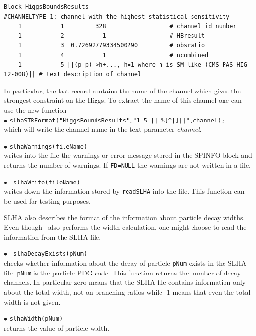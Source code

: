 \documentclass[12pt,a4paper]{article}
\begin{document}
{\scriptsize
\begin{verbatim}
Block HiggsBoundsResults 
#CHANNELTYPE 1: channel with the highest statistical sensitivity
    1           1         328                  # channel id number
    1           2           1                  # HBresult
    1           3  0.72692779334500290         # obsratio
    1           4           1                  # ncombined
    1           5 ||(p p)->h+..., h=1 where h is SM-like (CMS-PAS-HIG-12-008)|| # text description of channel
\end{verbatim}
}

\noindent 
In particular, the last record contains  the  name of the channel which gives the strongest constraint on the Higgs.  To extract the name
of this channel one can use the new function\\

\noindent
$\bullet$ \verb!slhaSTRFormat("HiggsBoundsResults","1 5 || %[^|]||",channel);!\\
which will write the channel name  in the text parameter {\it channel}. 

\noindent
$\bullet$ \verb|slhaWarnings(fileName)|\\                                                                              
writes into the file the warnings or error message  stored in the SPINFO block and
returns the number of warnings. If \verb|FD=NULL| the warnings are not written in a file.

\noindent
$\bullet$ \verb| slhaWrite(fileName)|\\
 writes down the information stored by 
\verb|readSLHA| into the file. This function can be used for testing purposes. 

SLHA  also describes the format of the information about particle decay widths.  
Even though \micro\ also performs the width calculation, one might choose to read the information from the SLHA file. 
 


\noindent
$\bullet$ \verb| slhaDecayExists(pNum)|\\
checks whether information about the  decay of particle \verb|pNum| exists in the SLHA file. 
\verb|pNum| is the particle PDG code. This function returns the number 
of decay channels. 
In particular zero means that the SLHA file contains  information only about the total width, not on branching ratios while 
-1 means that even the total width is not given.

\noindent
$\bullet$ \verb|slhaWidth(pNum)|\\ returns the value of particle width.
\end{document}

